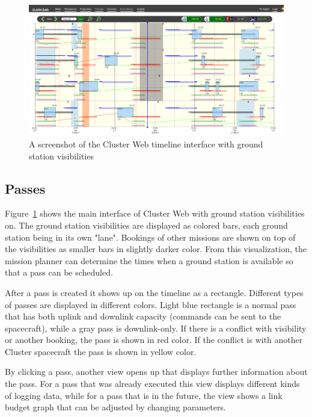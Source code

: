 \begin{figure}[ht]
  \begin{center}
    \includegraphics*[width=1\textwidth]{clusterweb_visibilities}
  \end{center}
  \caption{A screenshot of the Cluster Web timeline interface with ground station visibilities}
  \label{fig:clusterweb_visibilities}
\end{figure}

\subsection{Passes}
Figure~\ref{fig:clusterweb_visibilities} shows the main interface of Cluster Web with ground station visibilities on. The ground station visibilities are displayed as colored bars, each ground station being in its own "lane". Bookings of other missions are shown on top of the visibilities as smaller bars in slightly darker color. From this visualization, the mission planner can determine the times when a ground station is available so that a pass can be scheduled. 

After a pass is created it shows up on the timeline as a rectangle. Different types of passes are displayed in different colors. Light blue rectangle is a normal pass that has both uplink and downlink capacity (commands can be sent to the spacecraft), while a gray pass is downlink-only. If there is a conflict with visibility or another booking, the pass is shown in red color. If the conflict is with another Cluster spacecraft the pass is shown in yellow color.

By clicking a pass, another view opens up that displays further information about the pass. For a pass that was already executed this view displays different kinds of logging data, while for a pass that is in the future, the view shows a link budget graph that can be adjusted by changing parameters.

